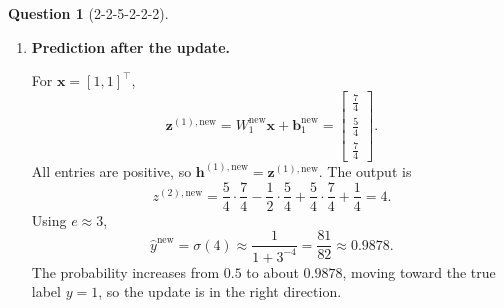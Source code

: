 \documentclass[12pt]{article}
\theoremstyle{definition}
\newtheorem{exercise}{Question}%
\newcommand{\pd}[2]{\dfrac{\partial #1}{\partial #2}}
\newcommand{\vect}[1]{\bm{#1}}
\begin{document}
\begin{exercise}[2-2-5-2-2-2]
{\begin{enumerate}[label=\textbf{(\arabic*)}, leftmargin=*, itemsep=1em]
    With $\eta=\frac12$, use
    $\theta^{\mathrm{new}}=\theta^{\mathrm{old}}-\frac12\pd{L}{\theta}$.
    All four updates use the initial gradients from part (4):
    \begin{align*}
        \vect{b}_1^{\mathrm{new}}
            &=\boxed{\begin{bmatrix}\frac14\\-\frac14\\\frac14\end{bmatrix}},
        &W_1^{\mathrm{new}}
            &=\boxed{\begin{bmatrix}
                \frac54&\frac14\\
                \frac34&\frac34\\
                \frac14&\frac54
            \end{bmatrix}},\\
        b_2^{\mathrm{new}}
            &=0-\frac12\left(-\frac12\right)=\boxed{\frac14},
        &W_2^{\mathrm{new}}
            &=\boxed{\begin{bmatrix}\frac54\\-\frac12\\\frac54\end{bmatrix}}.
    \end{align*}

    \item \textbf{Prediction after the update.}\nopagebreak[4]

    For $\vect{x}=[1,1]^\top$,
    \[
        \vect{z}^{(1),\mathrm{new}}
        =W_1^{\mathrm{new}}\vect{x}+\vect{b}_1^{\mathrm{new}}
        =\begin{bmatrix}\frac74\\\frac54\\\frac74\end{bmatrix}.
    \]
    All entries are positive, so
    $\vect{h}^{(1),\mathrm{new}}=\vect{z}^{(1),\mathrm{new}}$. The output is
    \[
        z^{(2),\mathrm{new}}
        =\frac54\cdot\frac74-\frac12\cdot\frac54
         +\frac54\cdot\frac74+\frac14=\boxed{4}.
    \]
    Using $e\approx3$,
    \[
        \hat{y}^{\mathrm{new}}=\sigma(4)
        \approx\frac{1}{1+3^{-4}}
        =\boxed{\frac{81}{82}\approx0.9878}.
    \]
    The probability increases from $0.5$ to about $0.9878$, moving toward
    the true label $y=1$, so the update is in the right direction.
\end{enumerate}
}

\end{exercise}
\end{document}
